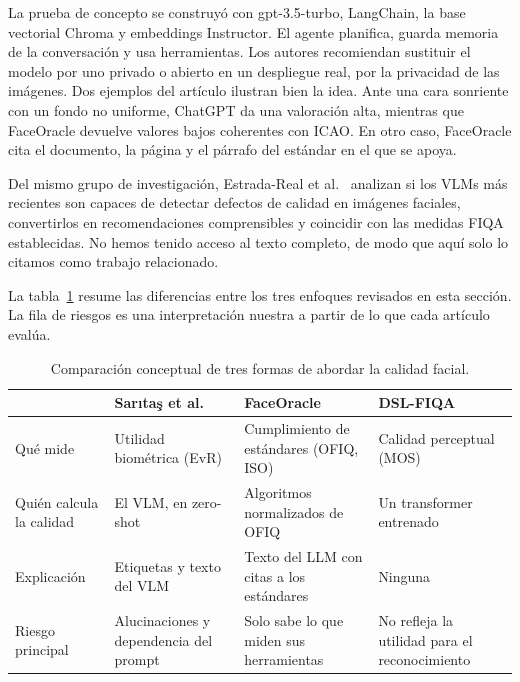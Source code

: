 La prueba de concepto se construyó con gpt-3.5-turbo, LangChain, la base vectorial Chroma y embeddings Instructor. El agente planifica, guarda memoria de la conversación y usa herramientas. Los autores recomiendan sustituir el modelo por uno privado o abierto en un despliegue real, por la privacidad de las imágenes. Dos ejemplos del artículo ilustran bien la idea. Ante una cara sonriente con un fondo no uniforme, ChatGPT da una valoración alta, mientras que FaceOracle devuelve valores bajos coherentes con ICAO. En otro caso, FaceOracle cita el documento, la página y el párrafo del estándar en el que se apoya.

Del mismo grupo de investigación, Estrada-Real et al.~\cite{EstradaReal_2026_IWBF} analizan si los VLMs más recientes son capaces de detectar defectos de calidad en imágenes faciales, convertirlos en recomendaciones comprensibles y coincidir con las medidas FIQA establecidas. No hemos tenido acceso al texto completo, de modo que aquí solo lo citamos como trabajo relacionado.

La tabla~\ref{tab:enfoques} resume las diferencias entre los tres enfoques revisados en esta sección. La fila de riesgos es una interpretación nuestra a partir de lo que cada artículo evalúa.

\begin{table}[htbp]
\centering\small
\caption{Comparación conceptual de tres formas de abordar la calidad facial.}
\label{tab:enfoques}
\begin{tabularx}{\linewidth}{@{}>{\raggedright\arraybackslash}p{2.3cm}XXX@{}}
\toprule
& Sarıtaş et al.~\cite{Saritas_2026_FG} & FaceOracle~\cite{Kabbani_2024_ECCVW} & DSL-FIQA~\cite{Chen_2024_CVPR} \\
\midrule
Qué mide & Utilidad biométrica (EvR) & Cumplimiento de estándares (OFIQ, ISO) & Calidad perceptual (MOS) \\
Quién calcula la calidad & El VLM, en zero-shot & Algoritmos normalizados de OFIQ & Un transformer entrenado \\
Explicación & Etiquetas y texto del VLM & Texto del LLM con citas a los estándares & Ninguna \\
Riesgo principal & Alucinaciones y dependencia del prompt & Solo sabe lo que miden sus herramientas & No refleja la utilidad para el reconocimiento \\
\bottomrule
\end{tabularx}
\end{table}

